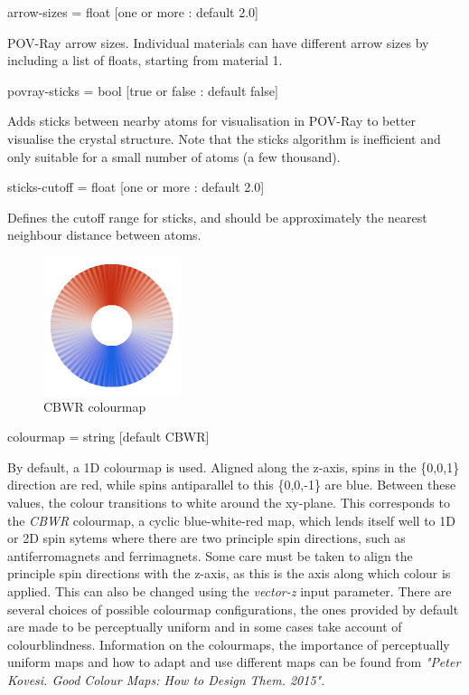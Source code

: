 {\zicf arrow-sizes = float [one or more : default 2.0]}
 POV-Ray arrow
sizes. Individual materials can have different arrow sizes by including a list
of floats, starting from material 1.

{\zicf povray-sticks = bool [true or false : default false]}
 Adds sticks
between nearby atoms for visualisation in POV-Ray to better visualise the
crystal structure. Note that the sticks algorithm is inefficient and only
suitable for a small number of atoms (a few thousand).

{\zicf sticks-cutoff = float [one or more : default 2.0]}
 Defines the
cutoff range for sticks, and should be approximately the nearest
neighbour distance between atoms.

\begin{figure}[!h]
\center
\includegraphics[width=4cm]{figures/CBWR_colourmap.jpg}
\\ CBWR colourmap
\label{fig:CBWR_colourmap}
\end{figure}

{\zicf colourmap = string [default CBWR]}
 By default, a 1D
colourmap is used. Aligned along the z-axis, spins in the \{0,0,1\} direction
are red, while spins antiparallel to this \{0,0,-1\} are blue. Between these
values, the colour transitions to white around the xy-plane. This corresponds to
the \textit{CBWR} colourmap, a cyclic blue-white-red map, which lends itself
well to 1D or 2D spin sytems where there are two principle spin directions, such
as antiferromagnets and ferrimagnets. Some care must be taken to align the
principle spin directions with the z-axis, as this is the axis along which
colour is applied. This can also be changed using the \textit{vector-z} input
parameter. There are several choices of possible colourmap configurations, the
ones provided by default are made to be perceptually uniform and in some cases
take account of colourblindness. Information on the colourmaps, the importance
of perceptually uniform maps and how to adapt and use different maps can be
found from \textit{"Peter Kovesi. Good Colour Maps: How to Design Them. 2015"}.

